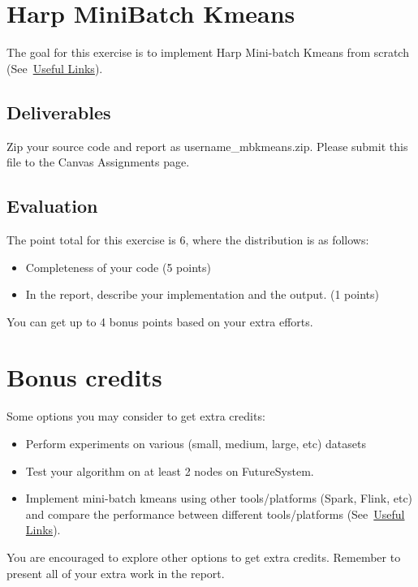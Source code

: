\section*{Harp Mini\-Batch Kmeans}


The goal for this exercise is to implement Harp Mini-batch Kmeans
from scratch (See~\hyperlink{link_exercise8}{Useful Links}). 

\subsection*{Deliverables}
Zip your source code and report as username\_mbkmeans.zip. Please submit this
file to the Canvas Assignments page.

\subsection*{Evaluation}

The point total for this exercise is 6, where the distribution is as
follows:

\begin{itemize}
\item Completeness of your code (5 points)
\item In the report, describe your implementation and the output. (1 points)
\end{itemize}

You can get up to 4 bonus points based on your extra efforts.

\section*{Bonus credits}

Some options you may consider to get extra credits: 

\begin{itemize}
\item Perform experiments on various (small, medium, large, etc)
  datasets
\item Test your algorithm on at least 2 nodes on FutureSystem.
\item Implement mini-batch kmeans using other tools/platforms (Spark,
  Flink, etc) and compare the performance between different
  tools/platforms (See~\hyperlink{link_exercise8}{Useful Links}).
\end{itemize}

You are encouraged to explore other options to get extra
credits. Remember to present all of your extra work in the report.
 
